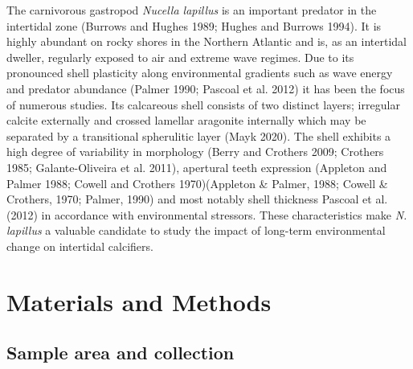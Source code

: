 \documentclass[smallextended]{svjour3}       %
\begin{document}
The carnivorous gastropod \emph{Nucella lapillus} is an important
predator in the intertidal zone (Burrows and Hughes 1989; Hughes and
Burrows 1994). It is highly abundant on rocky shores in the Northern
Atlantic and is, as an intertidal dweller, regularly exposed to air and
extreme wave regimes. Due to its pronounced shell plasticity along
environmental gradients such as wave energy and predator abundance
(Palmer 1990; Pascoal et al. 2012) it has been the focus of numerous
studies. Its calcareous shell consists of two distinct layers; irregular
calcite externally and crossed lamellar aragonite internally which may
be separated by a transitional spherulitic layer (Mayk 2020). The shell
exhibits a high degree of variability in morphology (Berry and Crothers
2009; Crothers 1985; Galante-Oliveira et al. 2011), apertural teeth
expression (Appleton and Palmer 1988; Cowell and Crothers 1970)(Appleton
\& Palmer, 1988; Cowell \& Crothers, 1970; Palmer, 1990) and most
notably shell thickness Pascoal et al. (2012) in accordance with
environmental stressors. These characteristics make \emph{N. lapillus} a
valuable candidate to study the impact of long-term environmental change
on intertidal calcifiers.

\hypertarget{materials-and-methods}{%
\section{Materials and Methods}\label{materials-and-methods}}

\hypertarget{sample-area-and-collection}{%
\subsection{Sample area and
collection}\label{sample-area-and-collection}}
\end{document}
